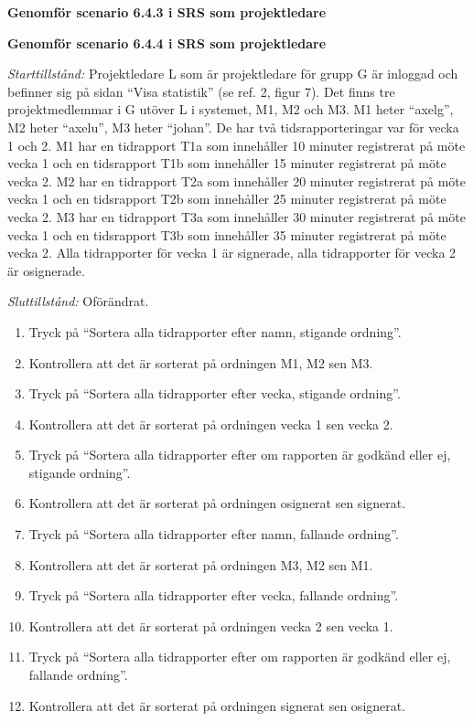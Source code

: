 \documentclass[a4paper]{article}
\begin{document}
\begin{ST}
\item
\textbf{Genomför scenario 6.4.3 i SRS som projektledare}

\item
\textbf{Genomför scenario 6.4.4 i SRS som projektledare}

\emph{Starttillstånd:} Projektledare L som är projektledare för grupp G är inloggad och befinner sig på sidan ``Visa statistik'' (se ref. 2, figur 7). Det finns tre projektmedlemmar i G utöver L i systemet, M1, M2 och M3. M1 heter ``axelg'', M2 heter ``axelu'', M3 heter ``johan''. De har två tidsrapporteringar var för vecka 1 och 2. M1 har en tidrapport T1a som innehåller 10 minuter registrerat på möte vecka 1 och en tidsrapport T1b som innehåller 15 minuter registrerat på möte vecka 2. M2 har en tidrapport T2a som innehåller 20 minuter registrerat på möte vecka 1 och en tidsrapport T2b som innehåller 25 minuter registrerat på möte vecka 2. M3 har en tidrapport T3a som innehåller 30 minuter registrerat på möte vecka 1 och en tidsrapport T3b som innehåller 35 minuter registrerat på möte vecka 2. Alla tidrapporter för vecka 1 är signerade, alla tidrapporter för vecka 2 är osignerade.

\emph{Sluttillstånd:} Oförändrat.

\begin{enumerate}
\item Tryck på ``Sortera alla tidrapporter efter namn, stigande ordning''.
\item Kontrollera att det är sorterat på ordningen M1, M2 sen M3.
\item Tryck på ``Sortera alla tidrapporter efter vecka, stigande ordning''.
\item Kontrollera att det är sorterat på ordningen vecka 1 sen vecka 2.
\item Tryck på ``Sortera alla tidrapporter efter om rapporten är godkänd eller ej, stigande ordning''.
\item Kontrollera att det är sorterat på ordningen osignerat sen signerat.
\item Tryck på ``Sortera alla tidrapporter efter namn, fallande ordning''.
\item Kontrollera att det är sorterat på ordningen M3, M2 sen M1.
\item Tryck på ``Sortera alla tidrapporter efter vecka, fallande ordning''.
\item Kontrollera att det är sorterat på ordningen vecka 2 sen vecka 1.
\item Tryck på ``Sortera alla tidrapporter efter om rapporten är godkänd eller ej, fallande ordning''.
\item Kontrollera att det är sorterat på ordningen signerat sen osignerat.
\end{enumerate}

\end{ST}
\end{document}

